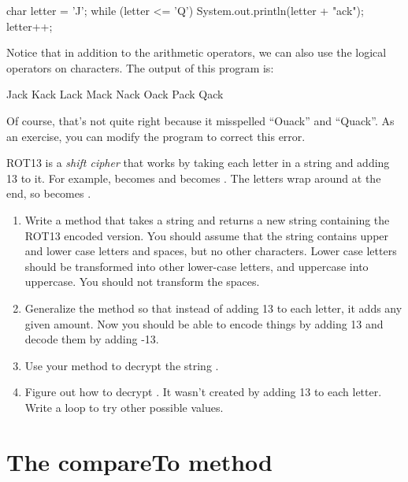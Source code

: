 \begin{code}
char letter = 'J';
while (letter <= 'Q') {
    System.out.println(letter + "ack");
    letter++;
}
\end{code}

Notice that in addition to the arithmetic operators, we can also use the logical operators on characters.
The output of this program is:

\begin{stdout}
Jack
Kack
Lack
Mack
Nack
Oack
Pack
Qack
\end{stdout}

Of course, that's not quite right because it misspelled ``Ouack'' and ``Quack''.
As an exercise, you can modify the program to correct this error.


\begin{exercise}

ROT13 is a {\em shift cipher} that works by taking each letter in a string and adding 13 to it.
For example,  becomes  and  becomes .
The letters wrap around at the end, so  becomes .

\begin{enumerate}

\item Write a method that takes a string and returns a new string containing the ROT13 encoded version.
You should assume that the string contains upper and lower case letters and spaces, but no other characters.
Lower case letters should be transformed into other lower-case letters, and uppercase into uppercase.
You should not transform the spaces.

\item Generalize the method so that instead of adding 13 to each letter, it adds any given amount.
Now you should be able to encode things by adding 13 and decode them by adding -13.

\item Use your method to decrypt the string .

\item Figure out how to decrypt .
It wasn't created by adding 13 to each letter.
Write a loop to try other possible values.

\end{enumerate}

\end{exercise}


\section{The compareTo method}

